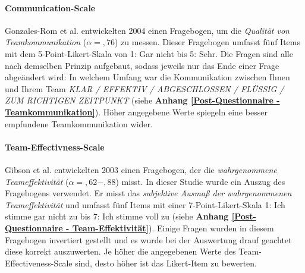 \documentclass[a4paper,11pt]{article}%
\renewcommand{\\}{\vspace*{0.5\baselineskip} \newline}
\begin{document}
{		\paragraph{Communication-Scale}
Gonzales-Rom et al. \citep[S. 1049]{gonzalez2014climate} entwickelten 2004 einen Fragebogen, um die \textit{Qualität von Teamkommunikation} ($\alpha =,76$) zu messen. Dieser Fragebogen umfasst fünf Items mit dem 5-Point-Likert-Skala von 1: \glqq{}Gar nicht\dq{} bis 5: \glqq{}Sehr\dq{}. Die Fragen sind alle nach demselben Prinzip aufgebaut, sodass jeweils nur das Ende einer Frage abgeändert wird: \glqq{}In welchem Umfang war die Kommunikation zwischen Ihnen und Ihrem Team \textit{KLAR / EFFEKTIV / ABGESCHLOSSEN / FLÜSSIG / ZUM RICHTIGEN ZEITPUNKT\dq{}} (siehe \textbf{Anhang \ref{Post-Questionnaire - Teamkommunikation}}). Höher angegebene Werte spiegeln eine besser empfundene Teamkommunikation wider.

		\paragraph{Team-Effectivness-Scale}
Gibson et al. \citep[S. 469]{gibson2003team} entwickelten 2003 einen Fragebogen, der die \textit{wahrgenommene Teameffektivität} ($\alpha =,62-,88$) misst. In dieser Studie wurde ein Auszug des Fragebogens verwendet. Er misst das \textit{subjektive Ausmaß der wahrgenommenen Teameffektivität} und umfasst fünf Items mit einer 7-Point-Likert-Skala 1: \glqq{}Ich stimme gar nicht zu\dq{} bis 7: \glqq{}Ich stimme voll zu\dq{} (siehe \textbf{Anhang \ref{Post-Questionnaire - Team-Effektivität}}). Einige Fragen wurden in diesem Fragebogen invertiert gestellt und es wurde bei der Auswertung drauf geachtet diese korrekt auszuwerten. Je höher die angegebenen Werte des Team-Effectiveness-Scale sind, desto höher ist das Likert-Item zu bewerten.


}
\end{document}
